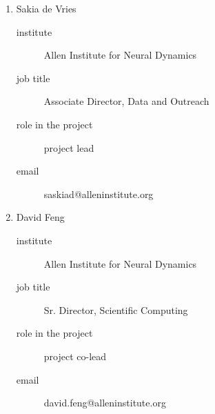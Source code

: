 
\begin{enumerate}

    \item Sakia de Vries

        \begin{description}
            \item[institute] Allen Institute for Neural Dynamics
            \item[job title] Associate Director, Data and Outreach
            \item[role in the project] project lead
            \item[email] saskiad@alleninstitute.org
        \end{description}

    \item David Feng

        \begin{description}
            \item[institute] Allen Institute for Neural Dynamics
            \item[job title] Sr. Director, Scientific Computing
            \item[role in the project] project co-lead
            \item[email] david.feng@alleninstitute.org
        \end{description}

\end{enumerate}

